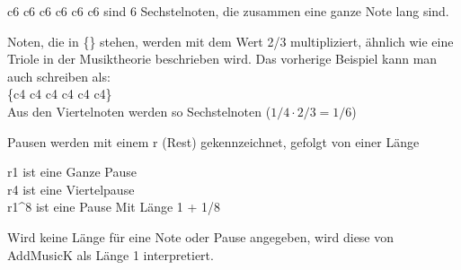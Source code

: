 c6 c6 c6 c6 c6 c6 sind 6 Sechstelnoten, die zusammen eine ganze Note lang sind.

\bigskip

Noten, die in \{\} stehen, werden mit dem Wert 2/3 multipliziert, ähnlich wie eine Triole in der Musiktheorie beschrieben wird. Das vorherige Beispiel kann man auch schreiben als: \\
\{c4 c4 c4 c4 c4 c4\} \\
Aus den Viertelnoten werden so Sechstelnoten ($1/4 \cdot 2/3 = 1/6$)

\bigskip

Pausen werden mit einem r (Rest) gekennzeichnet, gefolgt von einer Länge

\bigskip

r1 ist eine Ganze Pause \\
r4 ist eine Viertelpause \\
r1\textasciicircum8 ist eine Pause Mit Länge 1 + 1/8 

\bigskip

Wird keine Länge für eine Note oder Pause angegeben, wird diese von AddMusicK als Länge 1 interpretiert.
